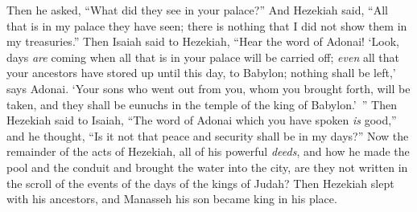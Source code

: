\begin{biblechapter}
\verse Then he asked, “What did they see in your palace?” And Hezekiah said, “All that is in my palace they have seen; there is nothing that I did not show them in my treasuries.”
\verse Then Isaiah said to Hezekiah, “Hear the word of Adonai!
\verse ‘Look, days \textit{are} coming when all that is in your palace will be carried off; \textit{even} all that your ancestors have stored up until this day, to Babylon; nothing shall be left,’ says Adonai.
\verse ‘Your sons who went out from you, whom you brought forth, will be taken, and they shall be eunuchs in the temple of the king of Babylon.’ ”
\verse Then Hezekiah said to Isaiah, “The word of Adonai which you have spoken \textit{is} good,” and he thought, “Is it not that peace and security shall be in my days?”
\verse Now the remainder of the acts of Hezekiah, all of his powerful \textit{deeds}, and how he made the pool and the conduit and brought the water into the city, are they not written in the scroll of the events of the days of the kings of Judah?
\verse Then Hezekiah slept with his ancestors, and Manasseh his son became king in his place.
\end{biblechapter}

